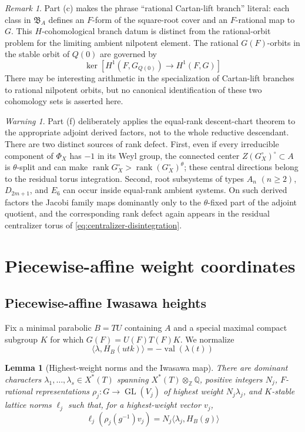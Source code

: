 \documentclass[11pt]{amsart}
\newtheorem{lemma}[lemma]{Lemma}
\theoremstyle{definition}
\theoremstyle{remark}
\newtheorem{remark}[remark]{Remark}
\newtheorem{warning}[warning]{Warning}
\newcommand{\rank}{\operatorname{rank}}
\newcommand{\GL}{\operatorname{GL}}
\newcommand{\val}{\operatorname{val}}
\begin{document}
\begin{remark}
Part \textup{(c)} makes the phrase ``rational Cartan-lift branch'' literal:
each class in $\mathfrak B_A$ defines an $F$-form of the square-root cover and
an $F$-rational map to $G$.  This $H$-cohomological branch datum is distinct
from the rational-orbit problem for the limiting ambient nilpotent element.
The rational $G(F)$-orbits in the stable orbit of $Q(0)$ are governed by
\[
 \ker\left[H^1(F,G_{Q(0)})\longrightarrow H^1(F,G)\right]
\]
There may be interesting arithmetic in the specialization of Cartan-lift
branches to rational nilpotent orbits, but no canonical identification of
these two cohomology sets is asserted here.
\end{remark}

\begin{warning}
Part \textup{(f)} deliberately applies the equal-rank descent-chart theorem
to the appropriate adjoint derived factors, not to the whole reductive
descendant.  There are two distinct sources of rank defect.  First, even if
every irreducible component of $\Phi_X$ has $-1$ in its Weyl group, the
connected center $Z(G_X^\circ)^\circ\subset A$ is $\theta$-split and can make
$\rank G_X^\circ>\rank (G_X^\circ)^\theta$; these central directions belong
to the residual torus integration.  Second, root subsystems of types $A_n$
$(n\geq2)$, $D_{2m+1}$, and $E_6$ can occur inside equal-rank ambient
systems.  On such derived factors the Jacobi family maps dominantly only to
the $\theta$-fixed part of the adjoint quotient, and the corresponding rank
defect again appears in the residual centralizer torus of
\cref{eq:centralizer-disintegration}.
\end{warning}

\section{Piecewise-affine weight coordinates}
\label{sec:jacobi-weights}

\subsection{Piecewise-affine Iwasawa heights}

Fix a minimal parabolic $B=TU$ containing $A$ and a special maximal compact
subgroup $K$ for which $G(F)=U(F)T(F)K$.  We normalize
\[
 \langle\lambda,H_B(utk)\rangle=-\val(\lambda(t))
\]

\begin{lemma}[Highest-weight norms and the Iwasawa map]
\label{lem:highest-weight-iwasawa}
There are dominant characters $\lambda_1,\ldots,\lambda_s\in X^*(T)$ spanning
$X^*(T)\otimes_\mathbb Z\mathbb Q$, positive integers $N_j$, $F$-rational
representations $\rho_j:G\to\GL(V_j)$ of highest weight $N_j\lambda_j$, and
$K$-stable lattice norms $\ell_j$ such that, for a highest-weight vector
$v_j$,
\[
 \ell_j(\rho_j(g^{-1})v_j)
 =N_j\langle\lambda_j,H_B(g)\rangle
\]
\end{lemma}
\end{document}
